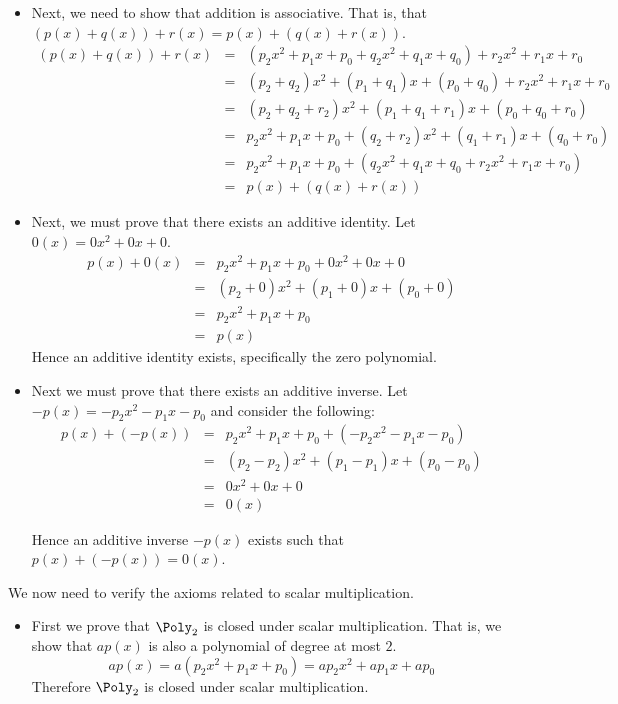 \begin{solution}
\begin{itemize}
\item
Next, we need to show that addition is associative. That is, that $(p(x) + q(x)) + r(x) = p(x) + (q(x)+r(x))$. 
\begin{eqnarray*}
(p(x) + q(x)) + r(x) &=& \left( p_2x^2 +p_1x + p_0 + q_2x^2 + q_1x + q_0 \right) + r_2x^2 +r_1x + r_0 \\
&=&  (p_2+q_2)x^2 + (p_1+q_1)x + (p_0 +q_0) + r_2x^2 + r_1x + r_0\\
&=&  (p_2+q_2+r_2)x^2 + (p_1+q_1+r_1)x + (p_0+q_0+r_0)  \\
&=&  p_2x^2 + p_1x + p_0 +  (q_2+r_2)x^2 + (q_1+r_1)x + (q_0+r_0)  \\
&=&  p_2x^2 + p_1x + p_0 + \left(  q_2x^2 +q_1x + q_0 + r_2x^2 + r_1x + r_0 \right)\\
&=& p(x) + \left( q(x) + r(x) \right)
\end{eqnarray*}

\item
Next, we must prove that there exists an additive identity. Let $0(x)=0x^2+0x+0$. 
\begin{eqnarray*}
p(x) + 0(x)  &=&  p_2x^2 + p_1x + p_0 + 0x^2 + 0x + 0 \\
&=&  (p_2 + 0)x^2  + (p_1 + 0)x + (p_0 + 0)\\
&=&  p_2x^2 + p_1x + p_0 \\
&=& p(x)
\end{eqnarray*}
Hence an additive identity exists, specifically the zero polynomial. 

\item 
Next we must prove that there exists an additive inverse. Let $-p(x) = -p_2x^2 - p_1x - p_0$ and consider the following:
\begin{eqnarray*}
p(x) + (-p(x)) &=&   p_2x^2 + p_1x + p_0 + \left( - p_2x^2  - p_1x - p_0\right) \\
&=& (p_2 - p_2)x^2  + (p_1 - p_1)x + (p_0 - p_0) \\
&=& 0x^2 + 0x + 0 \\
&=& 0(x)
\end{eqnarray*}

Hence an additive inverse $-p(x)$ exists such that $p(x) + (-p(x)) = 0(x)$. 
\end{itemize} 

We now need to verify the axioms related to scalar multiplication. 
\begin{itemize}
\item
First we prove that $\Poly_2$ is closed under scalar multiplication. That is, we show that $ap(x)$ is also a polynomial of degree at most $2$. 
\[
ap(x) = a\left(  p_2x^2 + p_1x + p_0 \right) = ap_2x^2 +ap_1x+ ap_0
\]
Therefore $\Poly_2$ is closed under scalar multiplication. 


\end{itemize}
\end{solution}
